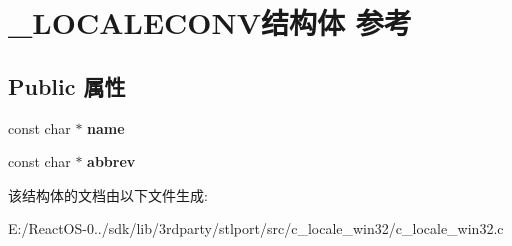 \hypertarget{struct___l_o_c_a_l_e_c_o_n_v}{}\section{\+\_\+\+L\+O\+C\+A\+L\+E\+C\+O\+N\+V结构体 参考}
\label{struct___l_o_c_a_l_e_c_o_n_v}
\subsection*{Public 属性}
\begin{DoxyCompactItemize}
\item 
\mbox{\label{struct___l_o_c_a_l_e_c_o_n_v_a2a7f555e222ea1ed3b6ada9b4282d3c5}} 
const char $\ast$ {\bfseries name}
\item 
\mbox{\label{struct___l_o_c_a_l_e_c_o_n_v_a2e95fa28a7c02b2c17841e344436f4ce}} 
const char $\ast$ {\bfseries abbrev}
\end{DoxyCompactItemize}


该结构体的文档由以下文件生成\+:\begin{DoxyCompactItemize}
\item 
E\+:/\+React\+O\+S-\/0../sdk/lib/3rdparty/stlport/src/c\+\_\+locale\+\_\+win32/c\+\_\+locale\+\_\+win32.\+c\end{DoxyCompactItemize}
